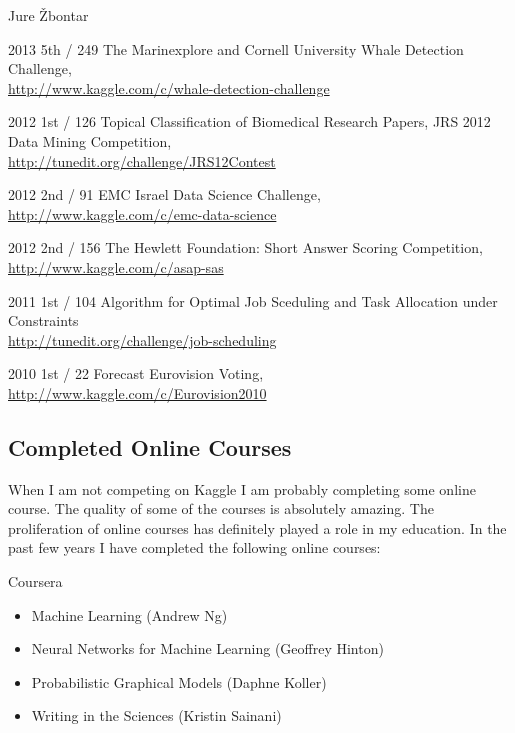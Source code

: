 \documentclass[12pt,a4paper]{article}
\begin{document}
\begin{cv}{Jure \v{Z}bontar}
\begin{cvlist}{}
\item[2013 \quad 5th / 249] The Marinexplore and Cornell University Whale Detection
Challenge\footnotemark[1], \\
\url{http://www.kaggle.com/c/whale-detection-challenge}
\item[2012 \quad 1st / 126] Topical Classification of Biomedical Research Papers,
JRS 2012 Data Mining Competition\footnotemark[2], \\
\url{http://tunedit.org/challenge/JRS12Contest}
\item[2012 \quad 2nd / 91] EMC Israel Data Science Challenge\footnotemark[2], \\
\url{http://www.kaggle.com/c/emc-data-science}
\item[2012 \quad 2nd / 156] The Hewlett Foundation: Short Answer Scoring
Competition\footnotemark[1], \\
\url{http://www.kaggle.com/c/asap-sas}
\item[2011 \quad 1st / 104] Algorithm for Optimal Job Sceduling and Task
Allocation under Constraints\footnotemark[1] \\
\url{http://tunedit.org/challenge/job-scheduling}
\item[2010 \quad 1st / 22] Forecast Eurovision Voting\footnotemark[1], \\
\url{http://www.kaggle.com/c/Eurovision2010}
\end{cvlist}


\subsection*{Completed Online Courses}
When I am not competing on Kaggle I am probably completing some online course.
The quality of some of the courses is absolutely amazing. The proliferation of
online courses has definitely played a role in my education. In the past few
years I have completed the following online courses:

\begin{cvlist}{}
\item[Coursera] 
\begin{itemize}
\item Machine Learning (Andrew Ng)
\item Neural Networks for Machine Learning (Geoffrey Hinton)
\item Probabilistic Graphical Models (Daphne Koller)
\item Writing in the Sciences (Kristin Sainani)
\end{itemize}


\end{cvlist}
\end{cv}
\end{document}
